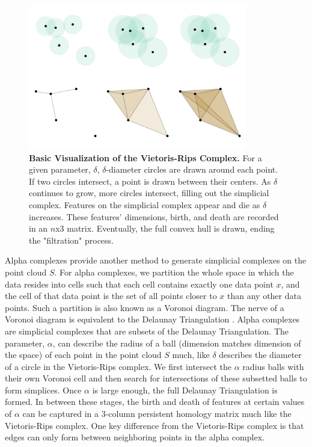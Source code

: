 \begin{figure}
  \centering
  \includegraphics[height=2.5in]{fig1.png}
  \caption{\textbf{Basic Visualization of the Vietoris-Rips Complex.}
  For a given parameter, $\delta$, $\delta$-diameter circles are drawn around each point.
  If two circles intersect, a point is drawn between their centers.
  As $\delta$ continues to grow, more circles intersect, filling out the simplicial complex.
  Features on the simplicial complex appear and die as $\delta$ increases.
  These features' dimensions, birth, and death are recorded in an $n$x3 matrix.
  Eventually, the full convex hull is drawn, ending the "filtration" process.}
\end{figure}

Alpha complexes provide another method to generate simplicial complexes
on the point cloud \(S\). For alpha complexes, we partition the whole
space in which the data resides into cells such that each cell contains
exactly one data point \(x\), and the cell of that data point is the set
of all points closer to \(x\) than any other data points. Such a
partition is also known as a Voronoi diagram. The nerve of a Voronoi
diagram is equivalent to the Delaunay Triangulation
\citep{alpha-complex}. Alpha complexes are simplicial complexes that are
subsets of the Delaunay Triangulation. The parameter, \(\alpha\), can
describe the radius of a ball (dimension matches dimension of the space)
of each point in the point cloud \(S\) much, like \(\delta\) describes
the diameter of a circle in the Vietoris-Rips complex. We first
intersect the \(\alpha\) radius balls with their own Voronoi cell and
then search for intersections of these subsetted balls to form
simplices. Once \(\alpha\) is large enough, the full Delaunay
Triangulation is formed. In between these stages, the birth and death of
features at certain values of \(\alpha\) can be captured in a 3-column
persistent homology matrix much like the Vietoris-Rips complex. One key
difference from the Vietoris-Rips complex is that edges can only form
between neighboring points in the alpha complex.

